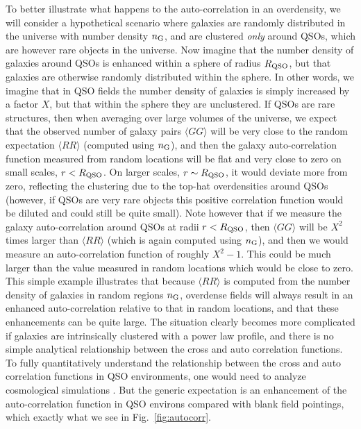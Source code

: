 \documentclass[iop, revtex4]{emulateapj}
\begin{document}
To better illustrate what happens to the auto-correlation in an
overdensity, we will consider a hypothetical scenario where galaxies
are randomly distributed in the universe with number density $n_{\rm
  G}$, and are clustered \emph{only} around QSOs, which are however
rare objects in the universe. Now imagine that the number
density of galaxies around QSOs is enhanced within a sphere of radius $R_{\rm QSO}$,
but that galaxies are otherwise randomly distributed within the sphere. In other
words, we imagine that in QSO fields the number density of galaxies is simply
increased by a factor $X$, but that within the sphere they are unclustered.
If QSOs are rare structures, then when averaging over large volumes of the universe,
we expect that the observed number of galaxy pairs
$\langle GG\rangle$ will be very close to the random expectation
$\langle RR\rangle$ (computed using $n_{\rm G}$), and
then the galaxy auto-correlation function measured from random locations
will be flat and very close to zero on small scales, $r< R_{\rm QSO}$. On larger scales, 
$r\sim R_{\rm QSO}$, it would deviate more from zero,
reflecting the clustering due to the top-hat overdensities around QSOs 
(however, if QSOs are very rare objects this positive correlation function
would be diluted and could still be quite small). 
Note however that if we measure the galaxy auto-correlation around QSOs
at radii $r < R_{\rm QSO}$, then $\langle GG\rangle$
will be $X^{2}$ times larger than $\langle RR\rangle$ (which is again
computed using $n_{\rm G}$), and then we would measure an auto-correlation
function of roughly $X^{2} -1$. This could be much larger
than the value measured in random locations which would be close to zero.
This simple example illustrates that because
$\langle RR\rangle$ is computed from the number density of galaxies in random regions $n_{\rm G}$,
overdense fields will always result in an enhanced auto-correlation
relative to that in random locations, and that these enhancements can be quite large.
The situation clearly becomes more
complicated if galaxies are intrinsically clustered with a power law
profile, and there is no simple analytical relationship between the cross and auto
correlation functions. To fully quantitatively understand the relationship between the cross and auto
correlation functions in QSO environments, one would need to analyze cosmological simulations
\citep[see e.g.][]{White12}. But the generic expectation is an enhancement of
the auto-correlation function in QSO environs compared with blank field pointings, which 
exactly what we see in Fig.~\ref{fig:autocorr}.
\end{document}
